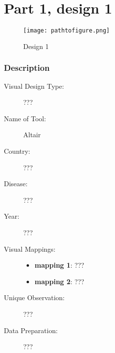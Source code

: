 \hypertarget{part-1-design-1}{%
\section{Part 1, design 1}\label{part-1-design-1}}

\begin{figure}
\centering
\texttt{[image: pathtofigure.png]}
\caption{Design 1}
\end{figure}

\hypertarget{description}{%
\subsubsection{Description}\label{description}}

\begin{description}
\item[Visual Design Type:]
???
\item[Name of Tool:]
Altair
\item[Country:]
???
\item[Disease:]
???
\item[Year:]
???
\item[Visual Mappings:]
\begin{itemize}
\tightlist
\item
  \textbf{mapping 1}: ???
\end{itemize}

\begin{itemize}
\tightlist
\item
  \textbf{mapping 2}: ???
\end{itemize}
\item[Unique Observation:]
???
\item[Data Preparation:]
???
\end{description}
